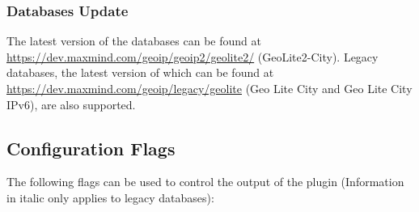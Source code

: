 \documentclass[documentation]{subfiles}
\begin{document}
\subsubsection{Databases Update}

The latest version of the databases can be found at \url{https://dev.maxmind.com/geoip/geoip2/geolite2/} (GeoLite2-City). Legacy databases, the latest version of which can be found at \url{https://dev.maxmind.com/geoip/legacy/geolite} (Geo Lite City and Geo Lite City IPv6), are also supported.

\subsection{Configuration Flags}
The following flags can be used to control the output of the plugin (Information in italic only applies to legacy databases):
\end{document}
